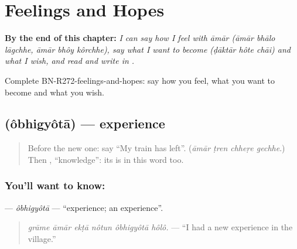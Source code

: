 
\chapter{Feelings and Hopes}
\label{ch:bn-feelings-and-hopes}

\begin{chapteropening}
\textbf{By the end of this chapter:} \emph{I can say how I feel with āmār (āmār bhālo lāgchhe, āmār bhôy kôrchhe), say what I want to become (ḍāktār hôte chāi) and what I wish, and read and write  in .}

Complete BN-R272-feelings-and-hopes: say how you feel, what you want to become and what you wish.
\end{chapteropening}

\section[\texorpdfstring{\bn{অভিজ্ঞতা} (ôbhigyôtā)}{অভিজ্ঞতা (ôbhigyôtā)}]{ (ôbhigyôtā) — experience}

\label{lesson:BN-C272-obhigyota}



\begin{quote}
Before the new one: say \textquotedblleft{}My train has left\textquotedblright{}. (\emph{āmār ṭren chheṛe gechhe}.) Then \textbf{}, \textquotedblleft{}knowledge\textquotedblright{}: its \textbf{} is in this word too.
\end{quote}

\subsection*{You'll want to know: }
\textbf{} — \emph{ôbhigyôtā} — \textquotedblleft{}experience; an experience\textquotedblright{}.

\begin{quote}
\textbf{     }
\end{quote}

\begin{quote}
\emph{grāme āmār ekṭā nôtun ôbhigyôtā hôlô.} — \textquotedblleft{}I had a new experience in the village.\textquotedblright{}
\end{quote}

